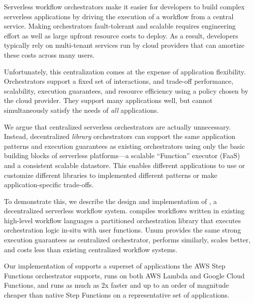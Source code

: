 Serverless workflow orchestrators make it easier for developers to build complex
serverless applications by driving the execution of a workflow from a central
service.  Making orchestrators fault-tolerant and scalable requires engineering
effort as well as large upfront resource costs to deploy. As a result,
developers typically rely on multi-tenant services run by cloud providers that
can amortize these costs across many users.

Unfortunately, this centralization comes at the expense of application
flexibility. Orchestrators support a fixed set of interactions, and trade-off
performance, scalability, execution guarantees, and resource efficiency using a
policy chosen by the cloud provider. They support many applications well, but
cannot simultaneously satisfy the needs of \emph{all} applications.

We argue that centralized serverless orchestrators are actually unnecessary.
Instead, decentralized \emph{library} orchestrators can support the same
application patterns and execution guarantees as existing orchestrators using
only the basic building blocks of serverless platforms---a scalable ``Function''
executor (FaaS) and a consistent scalable datastore. This enables different
applications to use or customize different libraries to implemented different
patterns or make application-specific trade-offs.

To demonstrate this, we describe the design and implementation of \name{}, a
decentralized serverless workflow system. \name{} compiles workflows written in
existing high-level workflow languages a partitioned orchestration library that
executes orchestration logic in-situ with user functions. Unum provides the same
strong execution guarantees as centralized orchestrator, performs similarly,
scales better, and costs less than existing centralized workflow systems.

Our implementation of \name{} supports a superset of applications the AWS Step
Functions orchestrator supports, runs on both AWS Lambda and Google Cloud
Functions, and runs as much as 2x faster and up to an order of magnitude cheaper
than native Step Functions on a representative set of applications.
